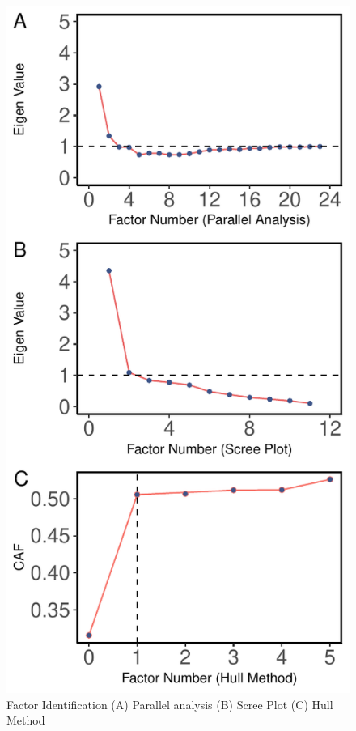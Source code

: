 \documentclass[
  man]{apa6}
\begin{document}
\begin{figure}

{\centering \includegraphics[width=1\linewidth,height=1\textheight]{Figures/600/factors} 

}

\caption{Factor Identification (A) Parallel analysis (B) Scree Plot (C) Hull Method}\label{fig:facIdFig}
\end{figure}
\end{document}
